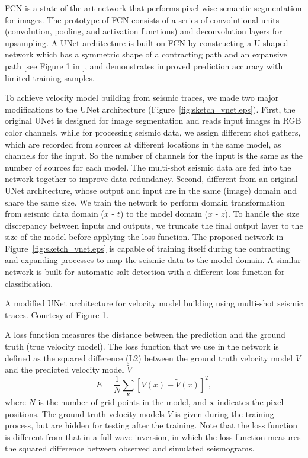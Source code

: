 \documentclass{segabs}
\begin{document}
FCN is a state-of-the-art network that performs pixel-wise semantic segmentation for images. The prototype of FCN consists of a series of convolutional units (convolution, pooling, and activation functions) and deconvolution layers for upsampling. A UNet architecture \citep{ronneberger15} is built on FCN by constructing a U-shaped network which has a symmetric shape of a contracting path and an expansive path [see Figure 1 in \citet{ronneberger15}], and demonstrates improved prediction accuracy with limited training samples. 

To achieve velocity model building from seismic traces, we made two major modifications to the UNet architecture (Figure~\ref{fig:sketch_vnet.eps}).
First, the original UNet is designed for image segmentation and reads input images in RGB color channels, while for processing seismic data, we assign different shot gathers, which are recorded from sources at different locations in the same model, as channels for the input. So the number of channels for the input is the same as the number of sources for each model. The multi-shot seismic data are fed into the network together to improve data redundancy. Second, different from an original UNet architecture, whose output and input are in the same (image) domain and share the same size. We train the network to perform domain transformation from seismic data domain ($x$ - $t$) to the model domain ($x$ - $z$). To handle the size discrepancy between inputs and outputs, we truncate the final output layer to the size of the model before applying the loss function. The proposed network in Figure~\ref{fig:sketch_vnet.eps} is capable of training itself during the contracting and expanding processes to map the seismic data to the model domain.
A similar network is built for automatic salt detection \citep{wenlong18_salt} with a different loss function for classification. 

{A modified UNet architecture for velocity model building using multi-shot seismic traces. Courtesy of \citet{ronneberger15} Figure 1.}

A loss function measures the distance between the prediction and the ground truth (true velocity model). The loss function that we use in the network is defined as the squared difference (L2) between the ground truth velocity model $V$ and the predicted velocity model $\tilde{V}$
\begin{equation}
E = \frac{1}{N}\sum_{\boldsymbol{x}} [V(x)-\tilde{V}(x)]^2,
\label{loss}
\end{equation}
where $N$ is the number of grid points in the model, and $\boldsymbol{x}$ indicates the pixel positions. The ground truth velocity models $V$ is given during the training process, but are hidden for testing after the training. Note that the loss function is different from that in a full wave inversion, in which the loss function measures the squared difference between observed and simulated seismograms.
\end{document}
